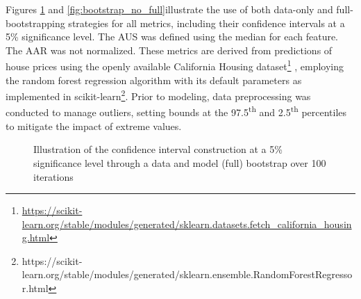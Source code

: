 Figures \ref{fig:bootstrap_full} and \ref{fig:bootstrap_no_full}illustrate the use of both data-only and full-bootstrapping strategies for all metrics, including their confidence intervals at a 5\% significance level. The \gls{AUS} was defined using the median for each feature. The \gls{AAR} was not normalized. These metrics are derived from predictions of house prices using the openly available California Housing dataset\footnote{\url{https://scikit-learn.org/stable/modules/generated/sklearn.datasets.fetch_california_housing.html}} , employing the random forest regression algorithm with its default parameters as implemented in scikit-learn\footnote{https://scikit-learn.org/stable/modules/generated/sklearn.ensemble.RandomForestRegressor.html}. Prior to modeling, data preprocessing was conducted to manage outliers, setting bounds at the 97.5\textsuperscript{th} and 2.5\textsuperscript{th} percentiles to mitigate the impact of extreme values. 


\begin{figure}[ht!]
\centering
  \caption{Illustration of the confidence interval construction at a 5\% significance level through a data and model (full) bootstrap over 100 iterations}
    \label{fig:bootstrap_full}
\end{figure}

